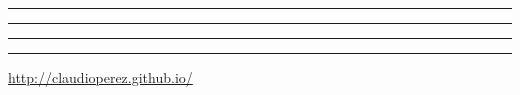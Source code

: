 \documentclass[9pt,landscape]{article}
\begin{document}
\begin{multicols}{2}
\vspace{1.0mm}

\hrule
\vspace{1.0mm}

\vspace{1.0mm}

\hrule
\vspace{1.5mm}

\vspace{1.5mm}

\hrule
\vspace{1.5mm}



\rule{0.3\linewidth}{0.25pt}
\scriptsize


\href{http://claudioperez.github.io/}{http://claudioperez.github.io/}


\end{multicols}
\end{document}
